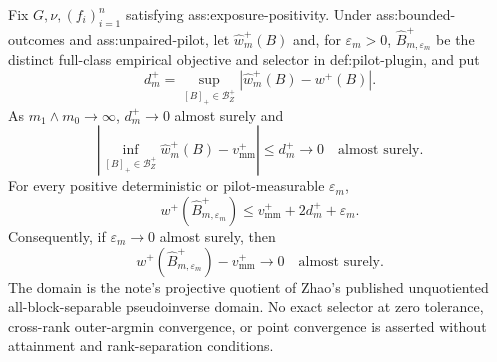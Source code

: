 Fix \(G,\nu,(f_i)_{i=1}^n\) satisfying ass:exposure-positivity.  Under ass:bounded-outcomes and ass:unpaired-pilot, let \(\widehat w_m^+(B)\) and, for \(\varepsilon_m>0\), \(\widehat B_{m,\varepsilon_m}^+\) be the distinct full-class empirical objective and selector in def:pilot-plugin, and put
\[
d_m^+=\sup_{[B]_+\in\mathcal B_Z^+}|\widehat w_m^+(B)-w^+(B)|.
\]
As \(m_1\wedge m_0\to\infty\), \(d_m^+\to0\) almost surely and
\[
\left|\inf_{[B]_+\in\mathcal B_Z^+}\widehat w_m^+(B)-v_{\mathrm{mm}}^+\right|
\le d_m^+\longrightarrow0
\quad\text{almost surely}.
\]
For every positive deterministic or pilot-measurable \(\varepsilon_m\),
\[
w^+(\widehat B_{m,\varepsilon_m}^+)
\le v_{\mathrm{mm}}^++2d_m^++\varepsilon_m.
\]
Consequently, if \(\varepsilon_m\to0\) almost surely, then
\[
w^+(\widehat B_{m,\varepsilon_m}^+)-v_{\mathrm{mm}}^+\longrightarrow0
\quad\text{almost surely}.
\]
The domain is the note's projective quotient of Zhao's published unquotiented all-block-separable pseudoinverse domain.  No exact selector at zero tolerance, cross-rank outer-argmin convergence, or point convergence is asserted without attainment and rank-separation conditions.